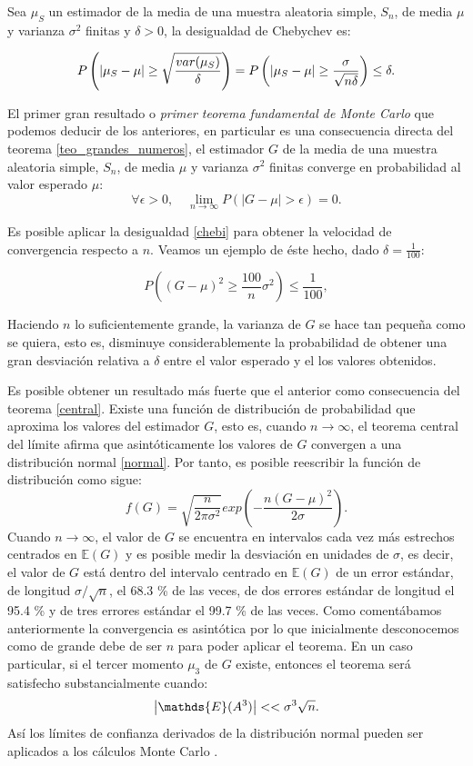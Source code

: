 \documentclass[../proyecto.tex]{memoir}
\begin{document}
\begin{defi} \label{chebi}
Sea $\mu_S$ un estimador de la media de una muestra aleatoria simple, $S_n$, de media $\mu$ y varianza $\sigma^2$ finitas y $\delta>0$, la desigualdad de Chebychev es:

$$
P \left( \abs{\mu_S-\mu} \geq \sqrt{\frac{var(\mu_S)}{\delta}} \right) = P \left( \abs{\mu_S-\mu} \geq \frac{\sigma}{\sqrt{n\delta}} \right)  \leq \delta.
$$

\end{defi}

El primer gran resultado o \textit{primer teorema fundamental de Monte Carlo} que podemos deducir de los anteriores, en particular es una consecuencia directa del teorema \ref{teo_grandes_numeros}, el estimador $G$ de la media de una muestra aleatoria simple, $S_n$, de media $\mu$ y varianza $\sigma^2$ finitas converge en probabilidad al valor esperado $\mu$:
$$
\forall \epsilon > 0,\quad \lim_{n\to\infty} P( |G - \mu|> \epsilon ) = 0.
$$

Es posible aplicar la desigualdad \ref{chebi} para obtener la velocidad de convergencia respecto a $n$. Veamos un ejemplo de éste hecho, dado $\delta=\frac{1}{100}$:

$$
P \left( ( G - \mu )^2 \geq \frac{100}{n} \sigma^2 \right)  \leq \frac{1}{100},
$$

Haciendo $n$ lo suficientemente grande, la varianza de $G$ se hace tan pequeña como se quiera, esto es, disminuye considerablemente la probabilidad de obtener una gran desviación relativa a $\delta$ entre el valor esperado y el los valores obtenidos.

Es posible obtener un resultado más fuerte que el anterior como consecuencia  del teorema \ref{central}. Existe una función de distribución de probabilidad que aproxima los valores del estimador $G$, esto es, cuando $n \to\infty$, el teorema central del límite afirma que asintóticamente los valores de $G$ convergen a una distribución normal \ref{normal}. Por tanto, es posible reescribir la función de distribución como sigue:
$$
f(G) = \sqrt{\frac{n}{2 \pi \sigma^2}} exp \left( - \frac{n(G-\mu)^2}{2\sigma} \right).
$$
Cuando $n \to\infty$, el valor de $G$ se encuentra en intervalos cada vez más estrechos centrados en $\mathds{E}(G)$ y es posible medir la desviación en unidades de $\sigma$, es decir, el valor de $G$ está dentro del intervalo centrado en $\mathds{E}(G)$ de un error estándar, de longitud $ \sigma / \sqrt{n} $, el 68.3 \% de las veces, de dos errores estándar de longitud el 95.4 \% y de tres errores estándar el 99.7 \%  de las veces. Como comentábamos anteriormente la convergencia es asintótica por lo que inicialmente desconocemos como de grande debe de ser $n$ para poder aplicar el teorema. En un caso particular, si el tercer momento $\mu_3$ de $G$ existe, entonces el teorema será satisfecho substancialmente cuando:
$$
\abs{\mathds{E}(A^3)} << \sigma^3 \sqrt{n}.
$$
Así los límites de confianza derivados de la distribución normal pueden ser aplicados a los cálculos Monte Carlo \cite{fundamentos_montecarlo}.
\end{document}
